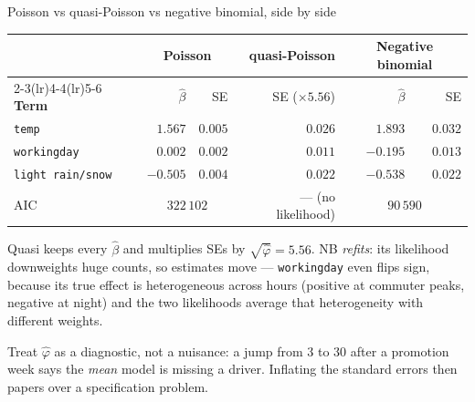 \documentclass[aspectratio=169,11pt]{beamer}
\begin{document}
\begin{frame}{Poisson vs quasi-Poisson vs negative binomial, side by side}
  \scriptsize
  \begin{center}
  \begin{tabular}{@{}lrrrrr@{}}
    \toprule
    & \multicolumn{2}{c}{\textbf{Poisson}} & \textbf{quasi-Poisson} & \multicolumn{2}{c}{\textbf{Negative binomial}} \\
    \cmidrule(lr){2-3}\cmidrule(lr){4-4}\cmidrule(lr){5-6}
    \textbf{Term} & $\hat\beta$ & SE & SE ($\times 5.56$) & $\hat\beta$ & SE \\
    \midrule
    \texttt{temp} & $1.567$ & $0.005$ & $0.026$ & $1.893$ & $0.032$ \\
    \texttt{workingday} & $0.002$ & $0.002$ & $0.011$ & $-0.195$ & $0.013$ \\
    \texttt{light rain/snow} & $-0.505$ & $0.004$ & $0.022$ & $-0.538$ & $0.022$ \\
    \midrule
    AIC & \multicolumn{2}{c}{$322\,102$} & --- (no likelihood) & \multicolumn{2}{c}{$90\,590$} \\
    \bottomrule
  \end{tabular}
  \end{center}
  \begin{readme}
    Quasi keeps every $\hat\beta$ and multiplies SEs by $\sqrt{\hat\varphi}=5.56$. NB
    \emph{refits}: its likelihood downweights huge counts, so estimates move ---
    \texttt{workingday} even flips sign, because its true effect is heterogeneous
    across hours (positive at commuter peaks, negative at night) and the two
    likelihoods average that heterogeneity with different weights.
  \end{readme}
  \begin{takeaway}
    Treat $\hat\varphi$ as a diagnostic, not a nuisance: a jump from 3 to 30 after a
    promotion week says the \emph{mean} model is missing a driver. Inflating the standard
    errors then papers over a specification problem.
  \end{takeaway}
\end{frame}
\end{document}
